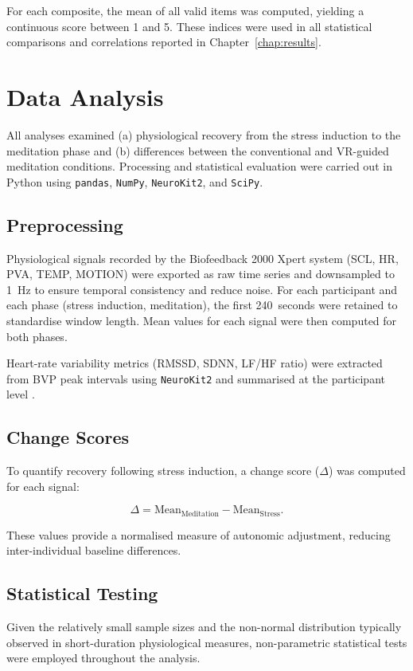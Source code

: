 For each composite, the mean of all valid items was computed, yielding a continuous score between 1 and 5. These indices were used in all statistical comparisons and correlations reported in Chapter~\ref{chap:results}.


\section{Data Analysis}
\label{sec:data-analysis}

All analyses examined (a) physiological recovery from the stress induction to the meditation phase and (b) differences between the conventional and VR-guided meditation conditions. Processing and statistical evaluation were carried out in Python using \texttt{pandas}, \texttt{NumPy}, \texttt{NeuroKit2}, and \texttt{SciPy}.

\subsection{Preprocessing}

Physiological signals recorded by the Biofeedback 2000 Xpert system (SCL, HR, PVA, TEMP, MOTION) were exported as raw time series and downsampled to 1~Hz to ensure temporal consistency and reduce noise. For each participant and each phase (stress induction, meditation), the first 240~seconds were retained to standardise window length. Mean values for each signal were then computed for both phases.  

Heart-rate variability metrics (RMSSD, SDNN, LF/HF ratio) were extracted from BVP peak intervals using \texttt{NeuroKit2} and summarised at the participant level \cite{makowski2021neurokit2}.

\subsection{Change Scores}

To quantify recovery following stress induction, a change score ($\Delta$) was computed for each signal:

\[
\Delta = \text{Mean}_{\text{Meditation}} - \text{Mean}_{\text{Stress}}.
\]

These values provide a normalised measure of autonomic adjustment, reducing inter-individual baseline differences.

\subsection{Statistical Testing}
Given the relatively small sample sizes and the non-normal distribution typically observed in short-duration physiological measures, non-parametric statistical tests were employed throughout the analysis.

